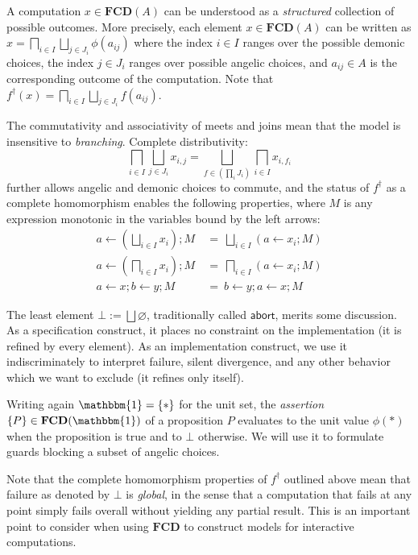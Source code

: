 \documentclass[11pt,oneside,draft]{book}
\theoremstyle{definition}
\newcommand{\kw}[1]{\ensuremath{ \mathsf{#1} }}
\begin{document}
A computation $x \in \mathbf{FCD}(A)$
can be understood as
a \emph{structured} collection of possible outcomes.
More precisely,
each element $x \in \mathbf{FCD}(A)$ can be written as
$
    x = \bigsqcap_{i \in I} \bigsqcup_{j \in J_i} \phi(a_{ij})
$
where
the index $i \in I$ ranges over the possible demonic choices,
the index $j \in J_i$ ranges over possible angelic choices,
and $a_{ij} \in A$ is the corresponding outcome of the computation.
Note that
$f^\dagger(x) = \bigsqcap_{i \in I} \bigsqcup_{j \in J_i} f(a_{ij})$.

The commutativity and associativity of meets and joins
mean that the model is insensitive to \emph{branching}.
Complete distributivity:
\[
    \bigsqcap_{i \in I} \bigsqcup_{j \in J_i} x_{i,j} =
    \bigsqcup_{f \in (\prod_i J_i)} \bigsqcap_{i \in I} x_{i, f_i}
\]
further allows angelic and demonic choices to commute,
and the status of $f^\dagger$ as a complete homomorphism
enables the following properties,
where $M$ is any expression monotonic in the variables
bound by the left arrows:
\begin{align*}
    a \leftarrow \left( \bigsqcup_{i \in I} x_i \right) \mathbin{;} M \: &= \:
      \bigsqcup_{i \in I} (a \leftarrow x_i \mathbin{;} M)
    \\
    a \leftarrow \left( \bigsqcap_{i \in I} x_i \right) \mathbin{;} M \: &= \:
      \bigsqcap_{i \in I} (a \leftarrow x_i \mathbin{;} M)
    \\
    a \leftarrow x \mathbin{;} b \leftarrow y \mathbin{;} M \: &= \:
    b \leftarrow y \mathbin{;} a \leftarrow x \mathbin{;} M
\end{align*}

The least element $\bot := \bigsqcup \varnothing$,
traditionally called $\kw{abort}$,
merits some discussion.
As a specification construct,
it places no constraint on the implementation
(it is refined by every element).
As an implementation construct,
we use it indiscriminately to interpret
failure, silent divergence,
and any other behavior
which we want to exclude (it refines only itself).

Writing again $\mathbbm{1} = \{ * \}$ for the unit set,
the \emph{assertion} $\{P\} \in \mathbf{FCD}(\mathbbm{1})$ of a proposition $P$
evaluates to the unit value $\phi(*)$ when the proposition is true
and to $\bot$ otherwise.
We will use it to formulate guards
blocking a subset of angelic choices.

Note that the complete homomorphism properties of $f^\dagger$
outlined above
mean that failure as denoted by $\bot$ is \emph{global},
in the sense that a computation that fails at any point
simply fails overall without yielding any partial result.
This is an important point to consider when using $\mathbf{FCD}$
to construct models for interactive computations.
\end{document}
